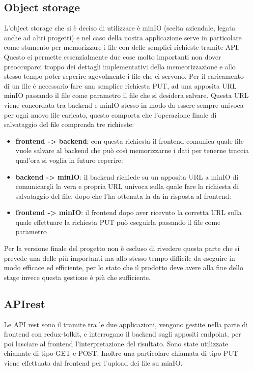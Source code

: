 \subsection*{Object storage}
L'object storage che si è deciso di utilizzare è minIO (scelta aziendale, legata anche ad altri progetti) e nel caso della nostra applicazione serve in particolare come stumento per memorizzare i file con delle semplici richieste tramite API.
Questo ci permette essenzialmente due cose molto importanti non dover preoccuparci troppo dei dettagli implementativi della memeorizzazione e allo stesso tempo poter
reperire agevolmente i file che ci servono. Per il caricamento di un file è necessario fare una semplice richiesta PUT, ad una apposita URL minIO passando il file come parametro il file che si desidera salvare.
Questa URL viene concordata tra backend e minIO stesso in modo da essere sempre univoca per ogni nuovo file caricato, questo comporta che l'operazione finale di salvataggio del file comprenda tre richieste:
\begin{itemize}
  \item \textbf{frontend -> backend}: con questa richiesta il frontend comunica quale file vuole salvare al backend che può così memorizzarne i dati per tenerne traccia qual'ora si voglia in futuro reperire;
  \item \textbf{backend -> minIO}: il backend richiede su un apposita URL a minIO di comunicargli la vera e propria URL univoca sulla quale fare la richiesta di salvataggio del file, dopo che l'ha ottenuta la da in risposta al frontend;
  \item \textbf{frontend -> minIO}: il frontend dopo aver ricevuto la corretta URL sulla quale effettuare la richiesta PUT può eseguirla passando il file come parametro
\end{itemize}
Per la versione finale del progetto non è escluso di rivedere questa parte che si prevede una delle più importanti ma allo stesso tempo difficile da eseguire in modo efficace ed efficiente, per lo stato che il prodotto deve avere alla fine dello stage invece
questa gestione è più che sufficiente.
\subsection*{APIrest}

Le API rest sono il tramite tra le due applicazioni, vengono gestite nella parte di frontend con redux-tolkit, e interrogano
il backend sugli appositi endpoint, per poi lasciare al frontend l'interpretazione del risultato. Sono state utilizzate chiamate di
tipo GET e POST. Inoltre una particolare chiamata di tipo PUT viene effettuata dal frontend per l'upload dei file su minIO.
